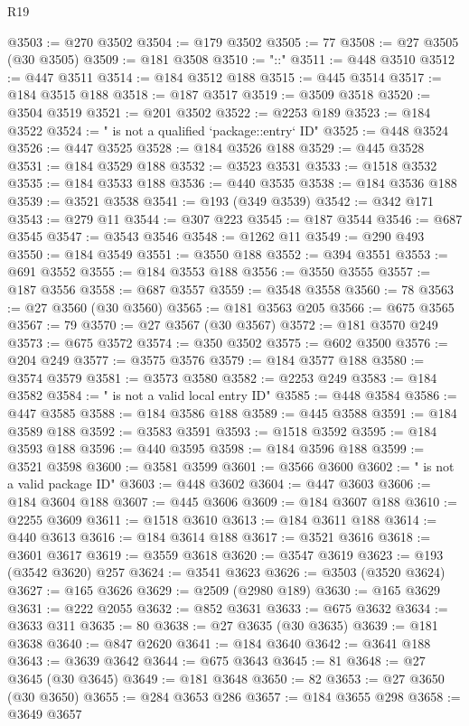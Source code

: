 \begin{lexlean}{R19}
\begin{coremodule}
@3503 := @270 @3502
@3504 := @179 @3502
@3505 := 77
@3508 := @27 @3505 (@30 @3505)
@3509 := @181 @3508
@3510 := "::"
@3511 := @448 @3510
@3512 := @447 @3511
@3514 := @184 @3512 @188
@3515 := @445 @3514
@3517 := @184 @3515 @188
@3518 := @187 @3517
@3519 := @3509 @3518
@3520 := @3504 @3519
@3521 := @201 @3502
@3522 := @2253 @189
@3523 := @184 @3522
@3524 := " is not a qualified `package::entry` ID"
@3525 := @448 @3524
@3526 := @447 @3525
@3528 := @184 @3526 @188
@3529 := @445 @3528
@3531 := @184 @3529 @188
@3532 := @3523 @3531
@3533 := @1518 @3532
@3535 := @184 @3533 @188
@3536 := @440 @3535
@3538 := @184 @3536 @188
@3539 := @3521 @3538
@3541 := @193 (@349 @3539)
@3542 := @342 @171
@3543 := @279 @11
@3544 := @307 @223
@3545 := @187 @3544
@3546 := @687 @3545
@3547 := @3543 @3546
@3548 := @1262 @11
@3549 := @290 @493
@3550 := @184 @3549
@3551 := @3550 @188
@3552 := @394 @3551
@3553 := @691 @3552
@3555 := @184 @3553 @188
@3556 := @3550 @3555
@3557 := @187 @3556
@3558 := @687 @3557
@3559 := @3548 @3558
@3560 := 78
@3563 := @27 @3560 (@30 @3560)
@3565 := @181 @3563 @205
@3566 := @675 @3565
@3567 := 79
@3570 := @27 @3567 (@30 @3567)
@3572 := @181 @3570 @249
@3573 := @675 @3572
@3574 := @350 @3502
@3575 := @602 @3500
@3576 := @204 @249
@3577 := @3575 @3576
@3579 := @184 @3577 @188
@3580 := @3574 @3579
@3581 := @3573 @3580
@3582 := @2253 @249
@3583 := @184 @3582
@3584 := " is not a valid local entry ID"
@3585 := @448 @3584
@3586 := @447 @3585
@3588 := @184 @3586 @188
@3589 := @445 @3588
@3591 := @184 @3589 @188
@3592 := @3583 @3591
@3593 := @1518 @3592
@3595 := @184 @3593 @188
@3596 := @440 @3595
@3598 := @184 @3596 @188
@3599 := @3521 @3598
@3600 := @3581 @3599
@3601 := @3566 @3600
@3602 := " is not a valid package ID"
@3603 := @448 @3602
@3604 := @447 @3603
@3606 := @184 @3604 @188
@3607 := @445 @3606
@3609 := @184 @3607 @188
@3610 := @2255 @3609
@3611 := @1518 @3610
@3613 := @184 @3611 @188
@3614 := @440 @3613
@3616 := @184 @3614 @188
@3617 := @3521 @3616
@3618 := @3601 @3617
@3619 := @3559 @3618
@3620 := @3547 @3619
@3623 := @193 (@3542 @3620) @257
@3624 := @3541 @3623
@3626 := @3503 (@3520 @3624)
@3627 := @165 @3626
@3629 := @2509 (@2980 @189)
@3630 := @165 @3629
@3631 := @222 @2055
@3632 := @852 @3631
@3633 := @675 @3632
@3634 := @3633 @311
@3635 := 80
@3638 := @27 @3635 (@30 @3635)
@3639 := @181 @3638
@3640 := @847 @2620
@3641 := @184 @3640
@3642 := @3641 @188
@3643 := @3639 @3642
@3644 := @675 @3643
@3645 := 81
@3648 := @27 @3645 (@30 @3645)
@3649 := @181 @3648
@3650 := 82
@3653 := @27 @3650 (@30 @3650)
@3655 := @284 @3653 @286
@3657 := @184 @3655 @298
@3658 := @3649 @3657

\end{coremodule}
\end{lexlean}
